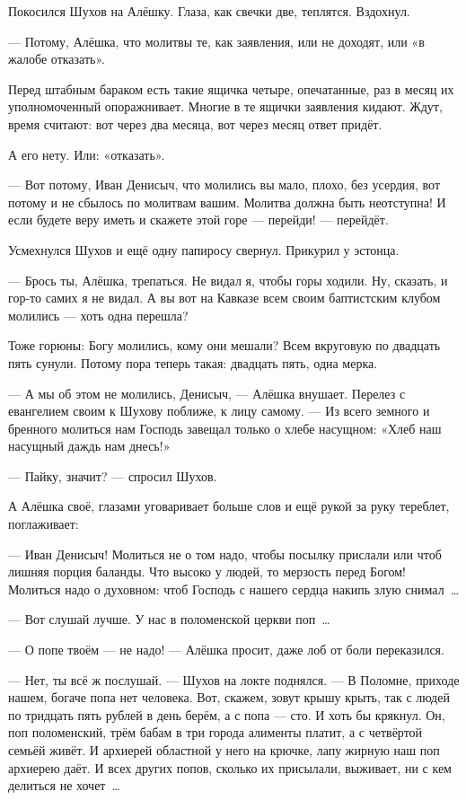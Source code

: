 Покосился Шухов на Алёшку. Глаза, как свечки две, теплятся. Вздохнул.

--- Потому, Алёшка, что молитвы те, как заявления, или не доходят, или «в жалобе отказать».

Перед штабным бараком есть такие ящичка четыре, опечатанные, раз в месяц их уполномоченный опоражнивает. Многие в те ящички заявления кидают. Ждут, время считают: вот через два месяца, вот через месяц ответ придёт.

А его нету. Или: «отказать».

--- Вот потому, Иван Денисыч, что молились вы мало, плохо, без усердия, вот потому и не сбылось по молитвам вашим. Молитва должна быть неотступна! И если будете веру иметь и скажете этой горе --- перейди! --- перейдёт.

Усмехнулся Шухов и ещё одну папиросу свернул. Прикурил у эстонца.

--- Брось ты, Алёшка, трепаться. Не видал я, чтобы горы ходили. Ну, сказать, и гор-то самих я не видал. А вы вот на Кавказе всем своим баптистским клубом молились --- хоть одна перешла?

Тоже горюны: Богу молились, кому они мешали? Всем вкруговую по двадцать пять сунули. Потому пора теперь такая: двадцать пять, одна мерка.

--- А мы об этом не молились, Денисыч, --- Алёшка внушает. Перелез с евангелием своим к Шухову поближе, к лицу самому. --- Из всего земного и бренного молиться нам Господь завещал только о хлебе насущном: «Хлеб наш насущный даждь нам днесь!»

--- Пайку, значит? --- спросил Шухов.

А Алёшка своё, глазами уговаривает больше слов и ещё рукой за руку тереблет, поглаживает:

--- Иван Денисыч! Молиться не о том надо, чтобы посылку прислали или чтоб лишняя порция баланды. Что высоко у людей, то мерзость перед Богом! Молиться надо о духовном: чтоб Господь с нашего сердца накипь злую снимал~\dots{}

--- Вот слушай лучше. У нас в поломенской церкви поп~\dots{}

--- О попе твоём --- не надо! --- Алёшка просит, даже лоб от боли переказился.

--- Нет, ты всё ж послушай. --- Шухов на локте поднялся. --- В Поломне, приходе нашем, богаче попа нет человека. Вот, скажем, зовут крышу крыть, так с людей по тридцать пять рублей в день берём, а с попа --- сто. И хоть бы крякнул. Он, поп поломенский, трём бабам в три города алименты платит, а с четвёртой семьёй живёт. И архиерей областной у него на крючке, лапу жирную наш поп архиерею даёт. И всех других попов, сколько их присылали, выживает, ни с кем делиться не хочет~\dots{}

